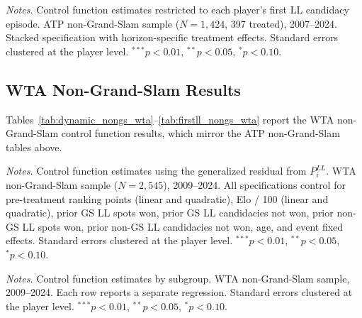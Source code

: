 \begin{table}[htbp]
\centering
\caption{ATP Non-Grand-Slam: First LL Episode Only (Control Function)}
\label{tab:firstll_nongs}
\begin{threeparttable}
\small

\begin{tablenotes}
\footnotesize
\item \textit{Notes.} Control function estimates restricted to each player's first LL candidacy episode. ATP non-Grand-Slam sample ($N = 1{,}424$, 397 treated), 2007--2024. Stacked specification with horizon-specific treatment effects. Standard errors clustered at the player level. $^{***}p<0.01$, $^{**}p<0.05$, $^{*}p<0.10$.
\end{tablenotes}
\end{threeparttable}
\end{table}

\subsection{WTA Non-Grand-Slam Results}
\label{app:nongs_wta}

Tables~\ref{tab:dynamic_nongs_wta}--\ref{tab:firstll_nongs_wta} report the WTA non-Grand-Slam control function results, which mirror the ATP non-Grand-Slam tables above.

\begin{table}[htbp]
\centering
\caption{WTA Non-Grand-Slam: Dynamic Effects (Stacked, Control Function)}
\label{tab:dynamic_nongs_wta}
\begin{threeparttable}
\small

\begin{tablenotes}
\footnotesize
\item \textit{Notes.} Control function estimates using the generalized residual from $P_i^{LL}$. WTA non-Grand-Slam sample ($N = 2{,}545$), 2009--2024. All specifications control for pre-treatment ranking points (linear and quadratic), Elo / 100 (linear and quadratic), prior GS LL spots won, prior GS LL candidacies not won, prior non-GS LL spots won, prior non-GS LL candidacies not won, age, and event fixed effects. Standard errors clustered at the player level. $^{***}p<0.01$, $^{**}p<0.05$, $^{*}p<0.10$.
\end{tablenotes}
\end{threeparttable}
\end{table}

\begin{table}[htbp]
\centering
\caption{WTA Non-Grand-Slam: Heterogeneous Effects (Control Function)}
\label{tab:hetero_nongs_wta}
\begin{threeparttable}
\small

\begin{tablenotes}
\footnotesize
\item \textit{Notes.} Control function estimates by subgroup. WTA non-Grand-Slam sample, 2009--2024. Each row reports a separate regression. Standard errors clustered at the player level. $^{***}p<0.01$, $^{**}p<0.05$, $^{*}p<0.10$.
\end{tablenotes}
\end{threeparttable}
\end{table}

